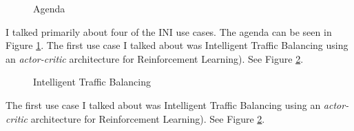 \documentclass[11pt, oneside]{article}   	%
\begin{document}
\begin{figure} [h!]
\caption{Agenda}
\label{fig:agenda}
\end{figure}


\bigskip
\noindent
I talked primarily about four of the INI use cases. The agenda can be seen in Figure \ref{fig:agenda}.  The first use case I talked about was Intelligent Traffic Balancing 
using an \emph{actor-critic} architecture for Reinforcement Learning\cite{Sutton:1998:IRL:551283,Lillicrap:2015aa}).  See Figure \ref{fig:intelligent_traffic_balancing}.

\begin{figure} [t]
\caption{Intelligent Traffic Balancing}
\label{fig:intelligent_traffic_balancing}
\end{figure}

\bigskip
\noindent
The first use case I talked about was Intelligent Traffic Balancing 
using an \emph{actor-critic} architecture for Reinforcement Learning\cite{Sutton:1998:IRL:551283,Lillicrap:2015aa}).  See Figure \ref{fig:intelligent_traffic_balancing}.
\end{document}
